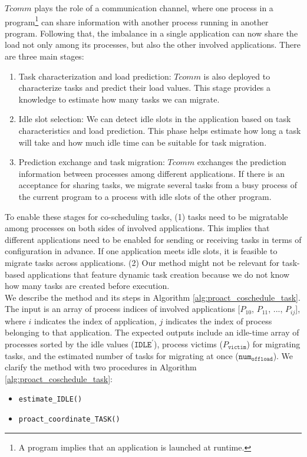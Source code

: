 $Tcomm$ plays the role of a communication channel, where one process in a program\footnote{A program implies that an application is launched at runtime.} can share information with another process running in another program. Following that, the imbalance in a single application can now share the load not only among its processes, but also the other involved applications. There are three main stages:

\begin{enumerate}
	\item Task characterization and load prediction: $Tcomm$ is also deployed to characterize tasks and predict their load values. This stage provides a knowledge to estimate how many tasks we can migrate.
	
	\item Idle slot selection: We can detect idle slots in the application based on task characteristics and load prediction. This phase helps estimate how long a task will take and how much idle time can be suitable for task migration.
	
	\item Prediction exchange and task migration: $Tcomm$ exchanges the prediction information between processes among different applications. If there is an acceptance for sharing tasks, we migrate several tasks from a busy process of the current program to a process with idle slots of the other program.
\end{enumerate}

To enable these stages for co-scheduling tasks, (1) tasks need to be migratable among processes on both sides of involved applications. This implies that different applications need to be enabled for sending or receiving tasks in terms of configuration in advance. If one application meets idle slots, it is feasible to migrate tasks across applications. (2) Our method might not be relevant for task-based applications that feature dynamic task creation because we do not know how many tasks are created before execution.\\

We describe the method and its steps in Algorithm \ref{alg:proact_coschedule_task}. The input is an array of process indices of involved applications [$P_{10}$, $P_{11}$, ..., $P_{ij}$], where $i$ indicates the index of application, $j$ indicates the index of process belonging to that application. The expected outputs include an idle-time array of processes sorted by the idle values ($\texttt{IDLE}^{'}$), process victims ($P_{\texttt{victim}}$) for migrating tasks, and the estimated number of tasks for migrating at once ($\texttt{num}_{\texttt{offload}}$). We clarify the method with two procedures in Algorithm \ref{alg:proact_coschedule_task}:
\begin{itemize}
	\item \texttt{estimate\_IDLE()}
	\item \texttt{proact\_coordinate\_TASK()}
\end{itemize}

